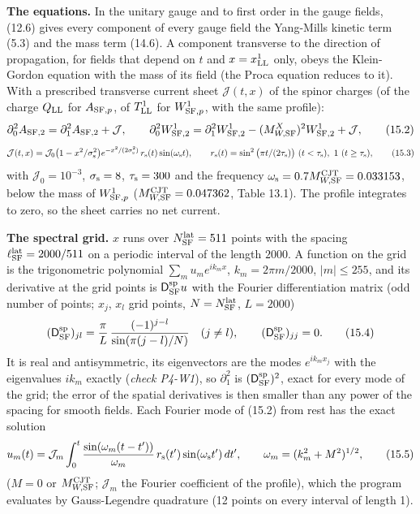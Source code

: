 \documentclass[
  10pt,
]{article}
\begin{document}
\textbf{The equations.} In the unitary gauge and to first order in the
gauge fields, (12.6) gives every component of every gauge field the
Yang-Mills kinetic term (5.3) and the mass term (14.6). A component
transverse to the direction of propagation, for fields that depend on
\(t\) and \(x=x^1_{\rm LL}\) only, obeys the Klein-Gordon equation with
the mass of its field (the Proca equation reduces to it). With a
prescribed transverse current sheet \(\mathcal J(t,x)\) of the spinor
charges (of the charge \(Q_{\rm LL}\) for \(A_{{\rm SF},p}\), of
\(T^1_{\rm LL}\) for \(W^1_{{\rm SF},p}\), with the same profile):
\[\partial_0^2A_{{\rm SF},2}=\partial_1^2A_{{\rm SF},2}+\mathcal J,\qquad\partial_0^2W^1_{{\rm SF},2}=\partial_1^2W^1_{{\rm SF},2}-(M^X_{W,{\rm SF}})^2W^1_{{\rm SF},2}+\mathcal J,\tag{15.2}\]
\[\mathcal J(t,x)=\mathcal J_0\big(1-x^2/\sigma_{\rm s}^2\big)e^{-x^2/(2\sigma_{\rm s}^2)}\,r_{\rm s}(t)\sin(\omega_{\rm s}t),\qquad r_{\rm s}(t)=\sin^2\big(\pi t/(2\tau_{\rm s})\big)\ (t<\tau_{\rm s}),\ 1\ (t\ge\tau_{\rm s}),\tag{15.3}\]
with \(\mathcal J_0=10^{-3}\), \(\sigma_{\rm s}=8\),
\(\tau_{\rm s}=300\) and the frequency
\(\omega_{\rm s}=0.7M^{\rm CJT}_{W,{\rm SF}}=0.033153\), below the mass
of \(W^1_{{\rm SF},p}\) (\(M^{\rm CJT}_{W,{\rm SF}}=0.047362\), Table
13.1). The profile integrates to zero, so the sheet carries no net
current.

\textbf{The spectral grid.} \(x\) runs over \(N^{\rm lat}_{\rm SF}=511\)
points with the spacing \(\ell^{\rm lat}_{\rm SF}=2000/511\) on a
periodic interval of the length \(2000\). A function on the grid is the
trigonometric polynomial \(\sum_mu_me^{ik_mx}\), \(k_m=2\pi m/2000\),
\(\lvert m\rvert\le255\), and its derivative at the grid points is
\(\mathsf D^{\rm sp}_{\rm SF}u\) with the Fourier differentiation matrix
(odd number of points; \(x_j\), \(x_l\) grid points,
\(N=N^{\rm lat}_{\rm SF}\), \(L=2000\))
\[(\mathsf D^{\rm sp}_{\rm SF})_{jl}=\frac{\pi}{L}\,\frac{(-1)^{j-l}}{\sin(\pi(j-l)/N)}\quad(j\neq l),\qquad(\mathsf D^{\rm sp}_{\rm SF})_{jj}=0.\tag{15.4}\]
It is real and antisymmetric, its eigenvectors are the modes
\(e^{ik_mx_j}\) with the eigenvalues \(ik_m\) exactly (\emph{check
P4-W1}), so \(\partial_1^2\) is \((\mathsf D^{\rm sp}_{\rm SF})^2\),
exact for every mode of the grid; the error of the spatial derivatives
is then smaller than any power of the spacing for smooth fields. Each
Fourier mode of (15.2) from rest has the exact solution
\[u_m(t)=\mathcal J_m\int_0^t\frac{\sin(\omega_m(t-t'))}{\omega_m}\,r_{\rm s}(t')\sin(\omega_{\rm s}t')\,dt',\qquad\omega_m=(k_m^2+M^2)^{1/2},\tag{15.5}\]
(\(M=0\) or \(M^{\rm CJT}_{W,{\rm SF}}\); \(\mathcal J_m\) the Fourier
coefficient of the profile), which the program evaluates by
Gauss-Legendre quadrature (12 points on every interval of length 1).
\end{document}
